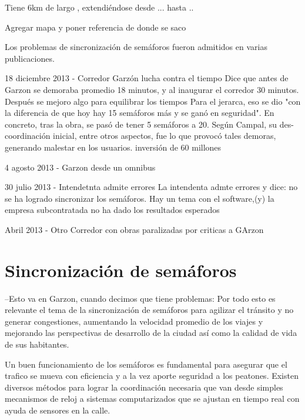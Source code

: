 Tiene 6km de largo , extendiéndose desde ...  hasta ..

Agregar mapa y poner referencia de donde se saco

Los problemas de sincronización de semáforos fueron admitidos en varias publicaciones.

18 diciembre 2013 - Corredor Garzón lucha contra el tiempo %
Dice que antes de Garzon se demoraba promedio 18 minutos, y al inaugurar el corredor 30 minutos. Después se mejoro algo para equilibrar los tiempos
Para el jerarca, eso se dio "con la diferencia de que hoy hay 15 semáforos más y se ganó en seguridad". En concreto, tras la obra, se pasó de tener 5 semáforos a 20. Según Campal, su des-coordinación inicial, entre otros aspectos, fue lo que provocó tales demoras, generando malestar en los usuarios.
inversión de 60 millones


4 agosto 2013 - Garzon desde un omnibus %


30 julio 2013  - Intendetnta admite errores %
La intendenta admte errores y dice: no se ha logrado sincronizar los semáforos. Hay un tema con el software,(y) la empresa subcontratada no ha dado los resultados esperados


Abril 2013 - Otro Corredor con obras paralizadas por criticas a GArzon


\section{Sincronización de semáforos}
--Esto va en Garzon, cuando decimos que tiene problemas:
Por todo esto es relevante el tema de la sincronización de semáforos para agilizar el tránsito y no generar congestiones, aumentando la velocidad promedio de los viajes y mejorando las perspectivas de desarrollo de la ciudad así como la calidad de vida de sus habitantes.


Un buen funcionamiento de los semáforos es fundamental para asegurar que el trafico se mueva con eficiencia y a la vez aporte seguridad a los peatones. 
Existen diversos métodos para lograr la coordinación necesaria que van desde simples mecanismos de reloj a sistemas computarizados que se ajustan en tiempo real con ayuda de sensores en la calle.

